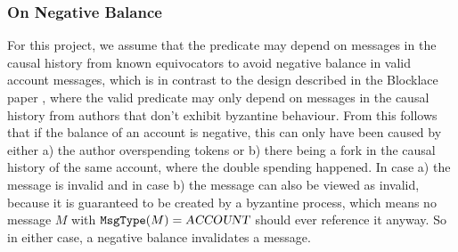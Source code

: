 \subsubsection{On Negative Balance}
\label{sec:neg-balance}
For this project, we assume that the predicate  may depend on messages in the causal history from known equivocators to avoid negative balance in valid account messages, which is in contrast to the design described in the Blocklace paper \cite{blocklace-crdt}, where the valid predicate may only depend on messages in the causal history from authors that don't exhibit byzantine behaviour. From this follows that if the balance of an account is negative, this can only have been caused by either a) the author overspending tokens or b) there being a fork in the causal history of the same account, where the double spending happened. In case a) the message is invalid and in case b) the message can also be viewed as invalid, because it is guaranteed to be created by a byzantine process, which means no message $M$ with $\texttt{MsgType}(M) = \textsl{ACCOUNT}$ should ever reference it anyway. So in either case, a negative balance invalidates a message.


